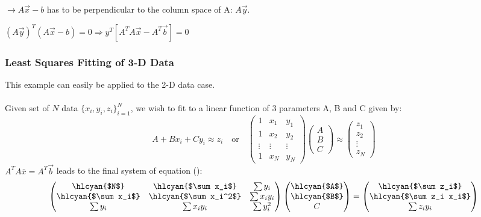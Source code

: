 \documentclass[8pt,a4paper]{scrartcl}
\begin{document}
\begin{multicols*}{3}
\finn

$\rightarrow A\vec{x}-b$ has to be perpendicular to the column space of A: $A\vec{y}$. 

$(A\vec{y})^T(A\vec{x}-b)=0\Rightarrow y^T[A^TA\vec{x}-A^T\vec{b}]=0$


\subsubsection{Least Squares Fitting of 3-D Data}

This example can easily be applied to the 2-D data case. \\ \\
Given set of $N$ data $\{x_i,y_i,z_i\}_{i=1}^N$, we wish to fit to a linear function of 3 parameters A, B and C given by:
\begin{equation*}
A + Bx_i + Cy_i \approx z_i  \quad \text{or} \quad
\begin{pmatrix}
1 & x_1 & y_1 \\
1 & x_2 & y_2 \\
\vdots & \vdots & \vdots \\
1 & x_N & y_N
\end{pmatrix}
\begin{pmatrix}
A\\
B\\
C
\end{pmatrix}
\approx
\begin{pmatrix}
z_1 \\
z_2 \\
\vdots \\
z_N
\end{pmatrix}
\end{equation*}
$A^TA\bar{x} = A^T \vec b$ leads to the final system of equation ():
\begin{equation*}
\begin{pmatrix}
$\hlcyan{$N$}$		& $\hlcyan{$\sum x_i$}$		& \sum y_i\\
$\hlcyan{$\sum x_i$}$	& $\hlcyan{$\sum x_i^2$}$	& \sum x_i y_i\\
\sum y_i	& \sum x_i y_i	& \sum y_i^2
\end{pmatrix}
\begin{pmatrix}
$\hlcyan{$A$}$\\
$\hlcyan{$B$}$\\
C
\end{pmatrix}
=
\begin{pmatrix}
$\hlcyan{$\sum z_i$}$\\
$\hlcyan{$\sum z_i x_i$}$\\
\sum z_i y_i
\end{pmatrix}
\end{equation*}


\end{multicols*}
\end{document}
